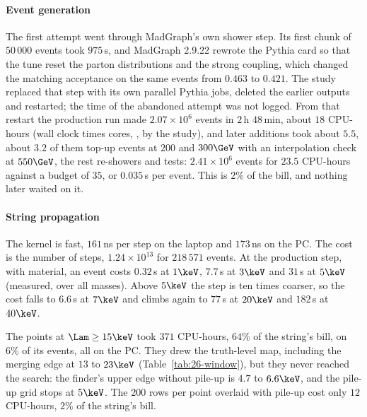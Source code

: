 \paragraph{Event generation}
The first attempt went through MadGraph's own shower step. Its first chunk of $50\,000$ events took $975$\,s, and MadGraph 2.9.22 rewrote the Pythia card so that the tune reset the parton distributions and the strong coupling, which changed the matching acceptance on the same events from $0.463$ to $0.421$. The study replaced that step with its own parallel Pythia jobs, deleted the earlier outputs and restarted; the time of the abandoned attempt was not logged. From that restart the production run made $2.07\times10^6$ events in $2$\,h $48$\,min, about $18$ CPU-hours (wall clock times cores, \EST, by the study), and later additions took about $5.5$, about $3.2$ of them top-up events at $200$ and $300\GeV$ with an interpolation check at $550\GeV$, the rest re-showers and tests: $2.41\times10^6$ events for $23.5$ CPU-hours against a budget of $35$, or $0.035$\,s per event. This is $2\%$ of the bill, and nothing later waited on it.

\paragraph{String propagation}
The kernel is fast, $161$\,ns per step on the laptop and $173$\,ns on the PC. The cost is the number of steps, $1.24\times10^{13}$ for $218\,571$ events. At the production step, with material, an event costs $0.32$\,s at $1\keV$, $7.7$\,s at $3\keV$ and $31$\,s at $5\keV$ (measured, over all masses). Above $5\keV$ the step is ten times coarser, so the cost falls to $6.6$\,s at $7\keV$ and climbs again to $77$\,s at $20\keV$ and $182$\,s at $40\keV$.

The points at $\Lam\ge15\keV$ took $371$ CPU-hours, $64\%$ of the string's bill, on $6\%$ of its events, all on the PC. They drew the truth-level map, including the merging edge at $13$ to $23\keV$ (Table~\ref{tab:26-window}), but they never reached the search: the finder's upper edge without pile-up is $4.7$ to $6.6\keV$, and the pile-up grid stops at $5\keV$. The $200$ rows per point overlaid with pile-up cost only $12$ CPU-hours, $2\%$ of the string's bill.

